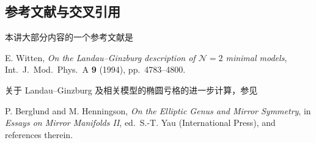 
\subsection*{参考文献与交叉引用}

本讲大部分内容的一个参考文献是

E. Witten, \emph{On the Landau--Ginzburg description of $\mathcal{N}=2$ minimal models}, Int.\ J.\ Mod.\ Phys.\ A \textbf{9} (1994), pp.\ 4783--4800.

关于 Landau--Ginzburg 及相关模型的椭圆亏格的进一步计算，参见

P. Berglund and M. Henningson, \emph{On the Elliptic Genus and Mirror Symmetry}, in \emph{Essays on
Mirror Manifolds II}, ed.\ S.-T. Yau (International Press), and references therein.
